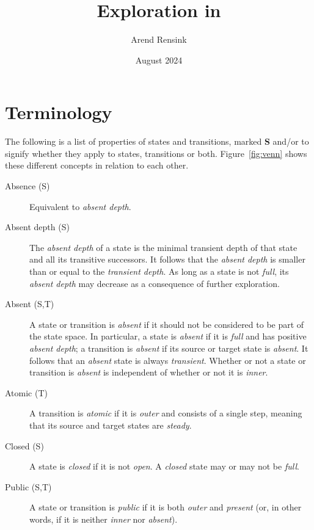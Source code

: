 \documentclass{article}
\begin{document}
\title{Exploration in \GROOVE}
\author{Arend Rensink}
\date{August 2024}
\maketitle

\section*{Terminology}

The following is a list of properties of states and transitions, marked \textbf{S} and/or  to signify whether they apply to states, transitions or both. Figure~\ref{fig:venn} shows these different concepts in relation to each other.

\begin{description}
\item[Absence (S)] Equivalent to \emph{absent depth}.

\item[Absent depth (S)] The \emph{absent depth} of a state is the minimal transient depth of that state and all its transitive successors. It follows that the \emph{absent depth} is smaller than or equal to the \emph{transient depth}. As long as a state is not \emph{full}, its \emph{absent depth} may decrease as a consequence of further exploration.

\item[Absent (S,T)] A state or transition is \emph{absent} if it should not be considered to be part of the state space. In particular, a state is \emph{absent} if it is \emph{full} and has positive \emph{absent depth}; a transition is \emph{absent} if its source or target state is \emph{absent}. It follows that an \emph{absent} state is always \emph{transient}. Whether or not a state or transition is \emph{absent} is independent of whether or not it is \emph{inner}.

\item[Atomic (T)] A transition is \emph{atomic} if it is \emph{outer} and consists of a single step, meaning that its source and target states are \emph{steady}.

\item[Closed (S)] A state is \emph{closed} if it is not \emph{open}. A \emph{closed} state may or may not be \emph{full}.

\item[Public (S,T)] A state or transition is \emph{public} if it is both \emph{outer} and \emph{present} (or, in other words, if it is neither \emph{inner} nor \emph{absent}).


\end{description}
\end{document}
